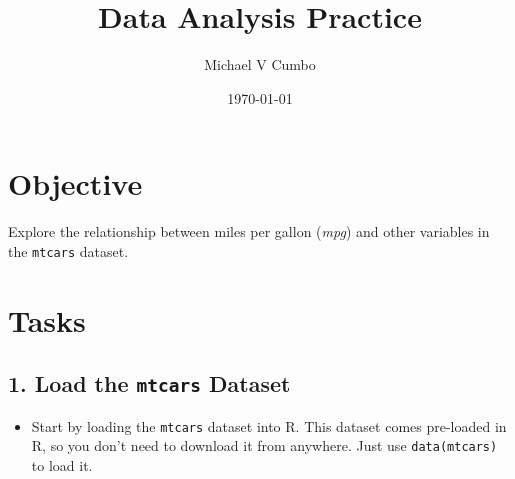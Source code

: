 \documentclass[11pt]{article}\usepackage[]{graphicx}\usepackage[]{xcolor}
\title{\textbf{Data Analysis Practice}}
\author{Michael V Cumbo}
\date{\today}
\begin{document}
\maketitle
\section*{Objective}
\rmfamily
Explore the relationship between miles per gallon (\textit{mpg}) and other variables in the \texttt{mtcars} dataset.

\section*{Tasks}

\subsection*{1. Load the \texttt{mtcars} Dataset}
\begin{itemize}
    \item Start by loading the \texttt{mtcars} dataset into R. This dataset comes pre-loaded in R, so you don't need to download it from anywhere. Just use \texttt{data(mtcars)} to load it.
\end{itemize}
\end{document}
